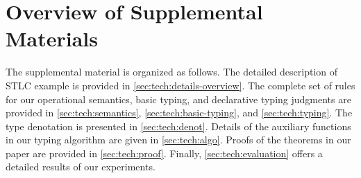 \section{Overview of Supplemental Materials}

The supplemental material is organized as follows. The detailed
description of STLC example is provided in
\autoref{sec:tech:details-overview}. The complete set of rules for our
operational semantics, basic typing, and declarative typing judgments
are provided in \autoref{sec:tech:semantics},
\autoref{sec:tech:basic-typing}, and \autoref{sec:tech:typing}. The
type denotation is presented in \autoref{sec:tech:denot}. Details of
the auxiliary functions in our typing algorithm are given in
\autoref{sec:tech:algo}. Proofs of the theorems in our paper are
provided in \autoref{sec:tech:proof}. Finally,
\autoref{sec:tech:evaluation} offers a detailed results of our
experiments.
